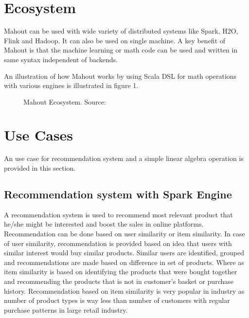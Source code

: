 \documentclass[9pt,twocolumn,twoside]{../../styles/osajnl}
\begin{document}
\section{Ecosystem}
Mahout can be used with wide variety of distributed systems like
Spark, H2O, Flink and Hadoop. It can also be used on single machine. A
key benefit of Mahout is that the machine learning or math code can be
used and written in same syntax independent of backends.

An illustration of how Mahout works by using Scala DSL for math
operations with various engines is illustrated in figure 1.

\begin{figure}[htbp]
\centering
{}
\caption{Mahout Ecosystem. \newline Source: \cite{www-weatheringDays}}
\label{fig:false-color}
\end{figure}
\section{Use Cases}

An use case for recommendation system and a simple linear algebra
operation is provided in this section.

\subsection{Recommendation system with Spark Engine}
A recommendation system is used to recommend most relevant product
that he/she might be interested and boost the sales in online
platforms. Recommendation can be done based on user similarity or item
similarity. In case of user similarity, recommendation is provided
based on idea that users with similar interest would buy similar
products. Similar users are identified, grouped and recommendations
are made based on difference in set of products. Where as item
similarity is based on identifying the products that were bought
together and recommending the products that is not in customer's
basket or purchase history. Recommendation based on item similarity is
very popular in industry as number of product types is way less than
number of customers with regular purchase patterns in large retail
industry.
\end{document}
